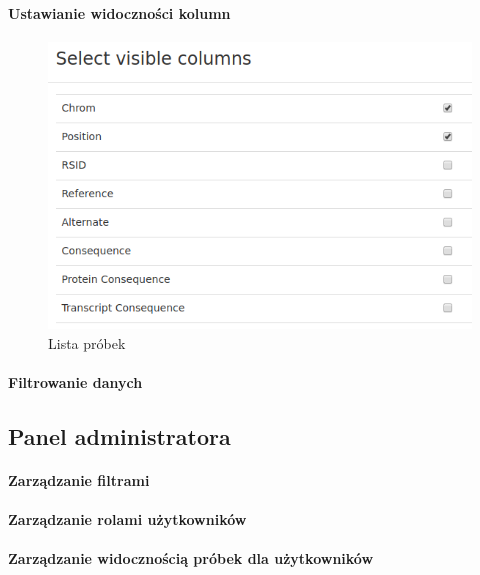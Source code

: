 \documentclass[a4paper,12pt,twoside]{article}
\begin{document}
\newpage
\paragraph{Ustawianie widoczności kolumn}
\begin{figure}[h!]
  \includegraphics[width=\linewidth]{obrazy/aplikacja/visible_columns.png}
  \caption{Lista próbek}
  \label{fig:visible_columnspic}
\end{figure}
\newpage

\paragraph{Filtrowanie danych}

\subsection{Panel administratora}
\paragraph{Zarządzanie filtrami}
\paragraph{Zarządzanie rolami użytkowników}
\paragraph{Zarządzanie widocznością próbek dla użytkowników}

\newpage
\end{document}
